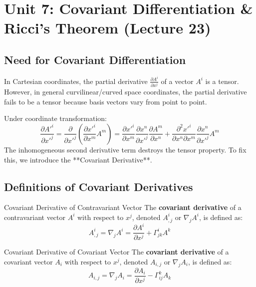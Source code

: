 \documentclass[11pt,a4paper]{article}
\begin{document}
\newpage
\section{Unit 7: Covariant Differentiation \& Ricci's Theorem (Lecture 23)}

\subsection{Need for Covariant Differentiation}
In Cartesian coordinates, the partial derivative $\frac{\partial A^i}{\partial x^j}$ of a vector $A^i$ is a tensor. However, in general curvilinear/curved space coordinates, the partial derivative fails to be a tensor because basis vectors vary from point to point.

Under coordinate transformation:
\[
\frac{\partial A'^i}{\partial x'^j} = \frac{\partial}{\partial x'^j} \left( \frac{\partial x'^i}{\partial x^m} A^m \right) = \frac{\partial x'^i}{\partial x^m} \frac{\partial x^n}{\partial x'^j} \frac{\partial A^m}{\partial x^n} + \frac{\partial^2 x'^i}{\partial x^n \partial x^m} \frac{\partial x^n}{\partial x'^j} A^m
\]
The inhomogeneous second derivative term destroys the tensor property. To fix this, we introduce the **Covariant Derivative**.

\subsection{Definitions of Covariant Derivatives}
\begin{definitionbox}{Covariant Derivative of Contravariant Vector}
The \textbf{covariant derivative} of a contravariant vector $A^i$ with respect to $x^j$, denoted $A^i_{,j}$ or $\nabla_j A^i$, is defined as:
\[
A^i_{,j} = \nabla_j A^i = \frac{\partial A^i}{\partial x^j} + \Gamma^i_{jk} A^k
\]
\end{definitionbox}

\begin{definitionbox}{Covariant Derivative of Covariant Vector}
The \textbf{covariant derivative} of a covariant vector $A_i$ with respect to $x^j$, denoted $A_{i,j}$ or $\nabla_j A_i$, is defined as:
\[
A_{i,j} = \nabla_j A_i = \frac{\partial A_i}{\partial x^j} - \Gamma^k_{ij} A_k
\]
\end{definitionbox}
\end{document}
